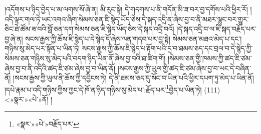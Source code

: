 །འདོགས་པ་ཉིད་བྱེད་པ་མ་ལགས་སོ་ཞེ་ན། མི་རུང་སྟེ། དེ་གདགས་པ་ནི་གདོན་མི་ཟ་བར་བྱ་དགོས་པའི་ཕྱིར་རོ། །འདི་ལྟར་གལ་ཏེ་ཡང་འགའ་ཞིག་སེམས་ཅན་ཇི་སྙེད་ཡོད་ཅེས་དེ་སྐད་འདྲི་ན་ཞེས་བྱ་བ་ནི་མཐར་ལྷུང་བར་གྱུར་ཅིང་ཐེ་ཚོམ་ཟ་བའི་བློ་ཅན་དག་སེམས་ཅན་ཇི་སྙེད་ཡོད་ཅེས་དེ་སྐད་འདྲི་བའོ། །དེ་སྐད་འདྲི་བ་ལ་ཇི་སྐད་བརྗོད་པར་བྱ་ཞེ་ན། སངས་རྒྱས་ཀྱི་ཆོས་ཇི་སྙེད་པ་དེ་སྙེད་དོ་ཞེས་ལན་གདབ་པར་བྱ་སྟེ། སེམས་ཅན་མཐའ་མེད་པ་དང་། གཉིས་སུ་མེད་པར་སྟོན་པ་ཡིན་ཏེ། སངས་རྒྱས་ཀྱི་ཆོས་ཇི་སྙེད་པ་རྟོག་པའི་དྲ་བ་ཐམས་ཅད་དང་བྲལ་བ་དེ་སྙེད་ཀྱི་སེམས་ཅན་གཉིས་སུ་མེད་པའི་བདག་ཉིད་ཡིན་ནོ་ཞེས་བྱ་བའི་ཐ་ཚིག་གོ། །སེམས་ཅན་གྱི་ཁམས་ཀྱི་ཚད་ཇི་ཙམ་ཞེས་བྱ་བ་ནི་འདིའི་ཚད་ཇི་ཙམ་ཞེས་བྱ་བ་ཡིན་ནོ། །སངས་རྒྱས་ཀྱི་ཡུལ་གྱི་ཚད་ཇི་ཙམ་ཞེས་བྱ་བ་ཡང་དེ་བཞིན་ནོ། །སངས་རྒྱས་ཀྱི་ཡུལ་ནི་ཆོས་ཀྱི་དབྱིངས་ཏེ། དེ་ནི་ཐམས་ཅད་དུ་སོང་བ་ཡིན་པའི་ཕྱིར་དཔག་ཏུ་མེད་པ་ཡིན་ནོ། །དཔེ་རྣམ་པ་འདི་གཉིས་ཀྱིས་ཀྱང་དེ་ཁོ་ན་ཉིད་གཉིས་སུ་མེད་པ་:རྗོད་པར་\footnote{«སྣར་»«པེ་»བརྗོད་པར་}བྱེད་པ་ཡིན་ཏེ། (111) <«སྣར་»«པེ་»ནོ། །
